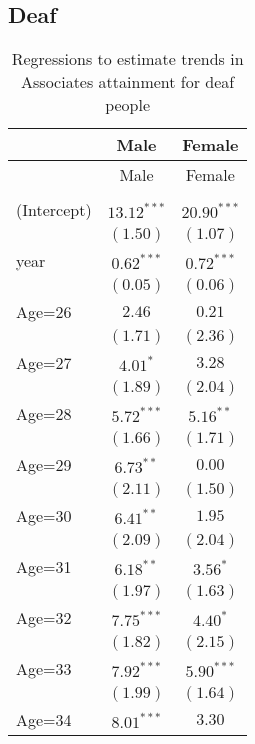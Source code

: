 \documentclass[fullpage]{paper}
\begin{document}
\subsection{ Deaf }

\begin{center}
\begin{longtable}{l c c }
\hline
 & Male & Female \\
\hline
\endfirsthead
\hline
 & Male & Female \\
\hline
\endhead
\hline
\endfoot
\hline
\multicolumn{3}{l}{\scriptsize{$^{***}p<0.001$, $^{**}p<0.01$, $^*p<0.05$}}\\
\caption{Regressions to estimate trends in Associates attainment for deaf people}
\label{table:coefficients}
\endlastfoot
(Intercept) & $13.12^{***}$ & $20.90^{***}$ \\
            & $(1.50)$      & $(1.07)$      \\
year        & $0.62^{***}$  & $0.72^{***}$  \\
            & $(0.05)$      & $(0.06)$      \\
Age=26      & $2.46$        & $0.21$        \\
            & $(1.71)$      & $(2.36)$      \\
Age=27      & $4.01^{*}$    & $3.28$        \\
            & $(1.89)$      & $(2.04)$      \\
Age=28      & $5.72^{***}$  & $5.16^{**}$   \\
            & $(1.66)$      & $(1.71)$      \\
Age=29      & $6.73^{**}$   & $0.00$        \\
            & $(2.11)$      & $(1.50)$      \\
Age=30      & $6.41^{**}$   & $1.95$        \\
            & $(2.09)$      & $(2.04)$      \\
Age=31      & $6.18^{**}$   & $3.56^{*}$    \\
            & $(1.97)$      & $(1.63)$      \\
Age=32      & $7.75^{***}$  & $4.40^{*}$    \\
            & $(1.82)$      & $(2.15)$      \\
Age=33      & $7.92^{***}$  & $5.90^{***}$  \\
            & $(1.99)$      & $(1.64)$      \\
Age=34      & $8.01^{***}$  & $3.30$        \\

\end{longtable}
\end{center}
\end{document}
